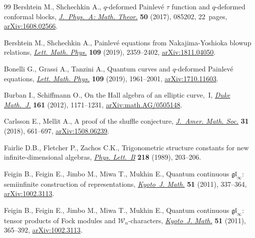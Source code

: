 \documentclass[pdftex]{sigma}
\numberwithin{equation}{section}
\theoremstyle{definition}
\begin{document}
\begin{thebibliography}{99}
Bershtein M., Shchechkin A., {$q$}-deformed {P}ainlev\'e {$\tau$} function and
 {$q$}-deformed conformal blocks, \href{https://doi.org/10.1088/1751-8121/aa5572}{\textit{J.~Phys.~A: Math. Theor.}}
 \textbf{50} (2017), 085202, 22~pages, \href{https://arxiv.org/abs/1608.02566}{arXiv:1608.02566}.

Bershtein M., Shchechkin A., Painlev\'{e} equations from {N}akajima-{Y}oshioka
 blowup relations, \href{https://doi.org/10.1007/s11005-019-01198-4}{\textit{Lett. Math. Phys.}} \textbf{109} (2019), 2359--2402,
 \href{https://arxiv.org/abs/1811.04050}{arXiv:1811.04050}.

Bonelli G., Grassi A., Tanzini A., Quantum curves and {$q$}-deformed
 {P}ainlev\'e equations, \href{https://doi.org/10.1007/s11005-019-01174-y}{\textit{Lett. Math. Phys.}} \textbf{109} (2019),
 1961--2001, \href{https://arxiv.org/abs/1710.11603}{arXiv:1710.11603}.

Burban I., Schiffmann O., On the {H}all algebra of an elliptic curve,~{I},
 \href{https://doi.org/10.1215/00127094-1593263}{\textit{Duke Math.~J.}} \textbf{161} (2012), 1171--1231,
 \href{https://arxiv.org/abs/math.AG/0505148}{arXiv:math.AG/0505148}.

Carlsson E., Mellit A., A proof of the shuffle conjecture, \href{https://doi.org/10.1090/jams/893}{\textit{J.~Amer.
 Math. Soc.}} \textbf{31} (2018), 661--697, \href{https://arxiv.org/abs/1508.06239}{arXiv:1508.06239}.

Fairlie D.B., Fletcher P., Zachos C.K., Trigonometric structure constants for
 new infinite-dimensional algebras, \href{https://doi.org/10.1016/0370-2693(89)91418-4}{\textit{Phys. Lett.~B}} \textbf{218}
 (1989), 203--206.

Feigin B., Feigin E., Jimbo M., Miwa T., Mukhin E., Quantum continuous
 {$\mathfrak{gl}_\infty$}: semiinfinite construction of representations,
 \href{https://doi.org/10.1215/21562261-1214375}{\textit{Kyoto~J. Math.}} \textbf{51} (2011), 337--364, \href{https://arxiv.org/abs/1002.3113}{arXiv:1002.3113}.

Feigin B., Feigin E., Jimbo M., Miwa T., Mukhin E., Quantum continuous
 {$\mathfrak{gl}_\infty$}: tensor products of {F}ock modules and {${\mathcal
 W}_n$}-characters, \href{https://doi.org/10.1215/21562261-1214384}{\textit{Kyoto~J. Math.}} \textbf{51} (2011), 365--392,
 \href{https://arxiv.org/abs/1002.3113}{arXiv:1002.3113}.


\end{thebibliography}
\end{document}
